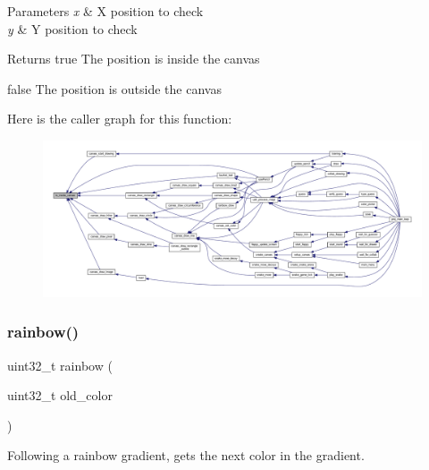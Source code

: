 \begin{DoxyParams}{Parameters}
{\em x} & X position to check \\
\hline
{\em y} & Y position to check \\
\hline
\end{DoxyParams}
\begin{DoxyReturn}{Returns}
true The position is inside the canvas 

false The position is outside the canvas 
\end{DoxyReturn}
Here is the caller graph for this function\+:\nopagebreak
\begin{figure}[H]
\begin{center}
\leavevmode
\includegraphics[width=350pt]{group__canvas_ga85fca0492c1f7ec8e1d20a9b5e48be1c_icgraph}
\end{center}
\end{figure}
\mbox{\label{group__canvas_ga4bac68c651bfc3551d7f9fbbdf7d0e18}} 
\subsubsection{\texorpdfstring{rainbow()}{rainbow()}}
{\footnotesize\ttfamily uint32\+\_\+t rainbow (\begin{DoxyParamCaption}\item[{uint32\+\_\+t}]{old\+\_\+color }\end{DoxyParamCaption})}



Following a rainbow gradient, gets the next color in the gradient. 


